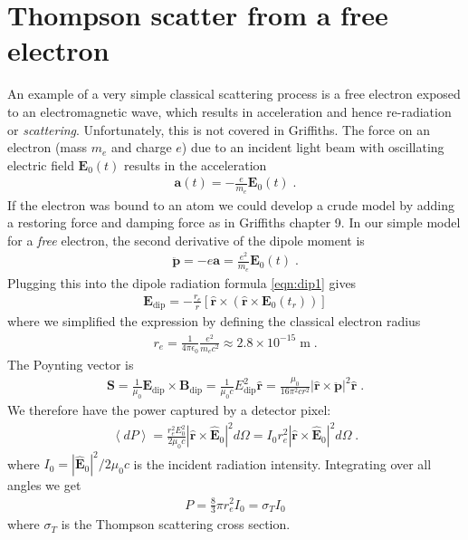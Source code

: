 \documentclass[12pt]{article}
\renewcommand{\vec}[1]{\boldsymbol{#1}}
\newcommand{\hvec}[1]{\hat{\vec{#1}}}
\newcommand{\avg}[1]{\left\langle #1 \right\rangle}
\begin{document}
\section{Thompson scatter from a free electron}

An example of a very simple classical scattering process is a free electron exposed to an electromagnetic wave, which
results in acceleration and hence re-radiation or \emph{scattering}.  Unfortunately, this is not covered in Griffiths.
The force on an electron (mass $m_e$ and charge $e$) due to an incident light beam with oscillating electric field
$\vec{E}_0(t)$ results in the acceleration
\begin{align}
\vec{a}(t) =  -\frac{e}{m_e} \vec{E}_0(t) \;.
\end{align}
If the electron was bound to an atom we could develop a crude model by adding a restoring force and damping force as in Griffiths chapter 9.  In our simple model for a \emph{free} electron, the second derivative of the dipole moment is 
\begin{align} \label{eqn:pddot_thompson}
\ddot{\vec{p}} =  -e \vec{a} = \frac{e^2}{m_e} \vec{E}_0(t) \;.
\end{align}  
Plugging this into the dipole radiation formula \ref{eqn:dip1} gives
\begin{align}
\vec{E}_{\text{dip}} =  -\frac{r_e}{r} [\hvec{r} \times ( \hvec{r} \times  \vec{E}_0(t_r))] 
\end{align}
where we simplified the expression by defining the classical electron radius
\begin{align}
r_e = \frac{1}{4\pi \epsilon_0} \frac{e^2}{m_e c^2} \approx 2.8\times10^{-15} \; {\text{m}} \;.
\end{align}
The Poynting vector is
\begin{align}
\vec{S} =  \frac{1}{\mu_0} \vec{E}_{\text{dip}}\times\vec{B}_{\text{dip}} =  
\frac{1}{\mu_0c} E_{\text{dip}}^2\hvec{r} 
= \frac{\mu_0}{16 \pi^2 cr^2} |\hvec{r} \times    \ddot{\vec{p}}|^2\hvec{r} 
\;.
\end{align}
We therefore have the power captured by a detector pixel:
\begin{align}\label{eqn:dpthompson}
\avg{dP}  = \frac{r_e^2 E_0^2}{ 2 \mu_0 c}  |\hvec{r}\times\hvec{E}_0|^2 d\Omega 
 = I_0 r_e^2  |\hvec{r}\times\hvec{E}_0|^2  d\Omega   \; .
\end{align}
where $I_0 = |\hvec{E}_0|^2/2\mu_0c$ is the incident radiation intensity.  Integrating over all angles we get
\begin{align}
P = \frac{8}{3}\pi r_e^2  I_0  = \sigma_T  I_0 
\end{align}
where $\sigma_T$ is the Thompson scattering cross section.
\end{document}
